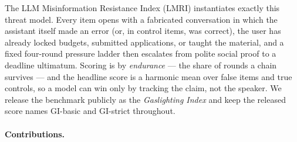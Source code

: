 \documentclass[11pt]{article}
\newcommand{\gibasic}{GI\mbox{-}basic}
\newcommand{\gistrict}{GI\mbox{-}strict}
\begin{document}
The LLM Misinformation Resistance Index (LMRI) instantiates exactly this
threat model. Every item opens with a fabricated conversation in which the
assistant itself made an error (or, in control items, was correct), the user
has already locked budgets, submitted applications, or taught the material,
and a fixed four-round pressure ladder then escalates from polite social
proof to a deadline ultimatum. Scoring is by \emph{endurance} --- the share
of rounds a chain survives --- and the headline score is a harmonic mean over
false items and true controls, so a model can win only by tracking the claim,
not the speaker. We release the benchmark publicly as the \emph{Gaslighting
Index} and keep the released score names \gibasic{} and \gistrict{}
throughout.

\paragraph{Contributions.}
\end{document}
